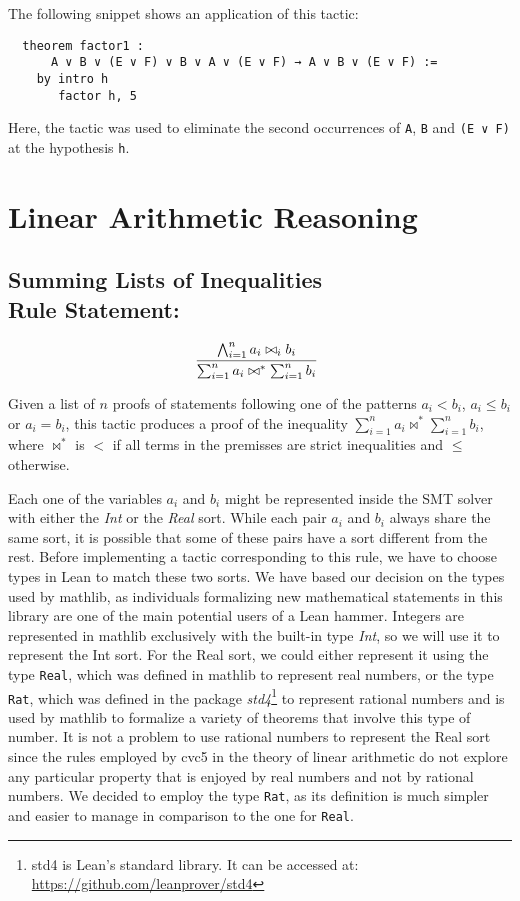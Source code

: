 The following snippet shows an application of this tactic:

\begin{verbatim}
  theorem factor1 :
      A ∨ B ∨ (E ∨ F) ∨ B ∨ A ∨ (E ∨ F) → A ∨ B ∨ (E ∨ F) :=
    by intro h
       factor h, 5
\end{verbatim}

Here, the tactic was used to eliminate the second occurrences of \texttt{A}, \texttt{B} and
\texttt{(E ∨ F)} at the hypothesis \texttt{h}.

\section{Linear Arithmetic Reasoning}

\subsection{Summing Lists of Inequalities\\Rule Statement:}
\[
  \infer[]{\sum_{i = 1}^{n} a_{i} \bowtie^{*} \sum_{i = 1}^{n} b_{i}}{\bigwedge_{i = 1}^{n} a_{i} \bowtie_{i} b_{i}}
\]

Given a list of $n$ proofs of statements following one of the patterns $a_{i} < b_{i}$, $a_{i} \le b_{i}$ or $a_{i} = b_{i}$, this
tactic produces a proof of the inequality $\sum_{i = 1}^{n} a_{i} \bowtie^{*} \sum_{i = 1}^{n} b_{i}$, where $\bowtie^{*}$ is $<$ if
all terms in the premisses are strict inequalities and $\le$ otherwise.

Each one of the variables $a_{i}$ and $b_{i}$ might be represented inside the SMT solver
with either the \textit{Int} or the \textit{Real} sort. While each pair $a_{i}$ and $b_{i}$ always share the same sort, it is possible that some of these pairs have a sort different from the rest. Before implementing a
tactic corresponding to this rule, we have to choose types in Lean to match
these two sorts. We have based our decision on the types used by mathlib, as
individuals formalizing new mathematical statements in this library are one of the main potential users
of a Lean hammer. Integers are represented in mathlib exclusively with the built-in type \textit{Int}, so we will use it to represent the Int sort.
For the Real sort, we could either represent it using the type \texttt{Real}, which was defined in mathlib
to represent real numbers, or the type \texttt{Rat}, which was defined in the package \textit{std4}\footnote{std4 is Lean's standard library. It can be accessed at: \url{https://github.com/leanprover/std4}} to
represent rational numbers and is used by mathlib to formalize a variety of theorems
that involve this type of number.
It is not a problem to use rational numbers to represent the Real sort since the rules employed by cvc5 in the theory of linear arithmetic
do not explore any particular property that is enjoyed by real numbers and not by
rational numbers.
We decided to employ the type \texttt{Rat}, as its definition is much simpler and easier
to manage in comparison to the one for \texttt{Real}.

